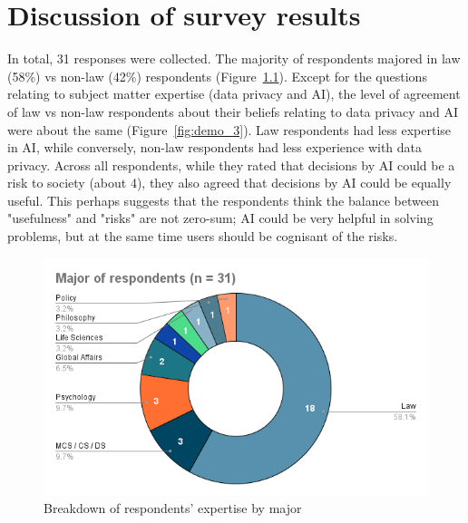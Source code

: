 \chapter{Discussion of survey results}
\label{chapter4}

In total, 31 responses were collected. The majority of respondents majored in law (58\%) vs non-law (42\%) respondents (Figure~\ref{fig:demo_1}). Except for the questions relating to subject matter expertise (data privacy and AI), the level of agreement of law vs non-law respondents about their beliefs relating to data privacy and AI were about the same (Figure~\ref{fig:demo_3}). Law respondents had less expertise in AI, while conversely, non-law respondents had less experience with data privacy. Across all respondents, while they rated that decisions by AI could be a risk to society (about 4), they also agreed that decisions by AI could be equally useful. This perhaps suggests that the respondents think the balance between "usefulness" and "risks" are not zero-sum; AI could be very helpful in solving problems, but at the same time users should be cognisant of the risks.

\begin{figure}[!ht]
  \centering
  \includegraphics[width=0.85\linewidth]{figures/major_respondents.png}
  \caption{Breakdown of respondents' expertise by major}
  \label{fig:demo_1}
\end{figure}

